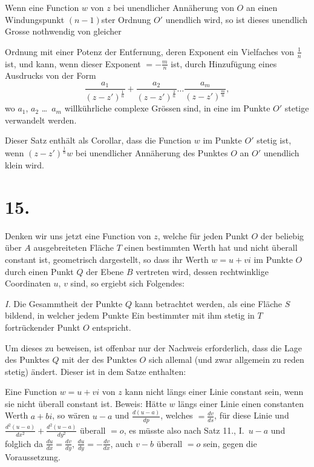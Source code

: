 \documentclass{article}
\begin{document}
Wenn eine Function $w$ von $z$ bei unendlicher Annäherung von $O$ an einen Windungspunkt $(n-1)$ster Ordnung $O'$ unendlich wird, so ist dieses unendlich Grosse nothwendig von gleicher

Ordnung mit einer Potenz der Entfernung, deren Exponent ein Vielfaches von $\frac{1}{n}$ ist, und kann, wenn dieser Exponent $= -\frac{m}{n}$ ist, durch Hinzufügung eines Ausdrucks von der Form
\[
\frac{a_1}{(z - z')^{\frac{1}{n}}} + \frac{a_2}{(z - z')^{\frac{2}{n}}} \dots \frac{a_m}{(z - z')^{\frac{m}{n}}},
\]
wo $a_1$, $a_2$ \dots\ $a_m$ willkührliche complexe Grössen sind, in eine im Punkte $O'$ stetige verwandelt werden.

Dieser Satz enthält als Corollar, dass die Function $w$ im Punkte $O'$ stetig ist, wenn $(z - z')^{\frac{1}{n}} w$ bei unendlicher Annäherung des Punktes $O$ an $O'$ unendlich klein wird.

\section*{15.}

Denken wir uns jetzt eine Function von $z$, welche für jeden Punkt $O$ der beliebig über $A$ ausgebreiteten Fläche $T$ einen bestimmten Werth hat und nicht überall constant ist, geometrisch dargestellt, so dass ihr Werth $w = u + vi$ im Punkte $O$ durch einen Punkt $Q$ der Ebene $B$ vertreten wird, dessen rechtwinklige Coordinaten $u$, $v$ sind, so ergiebt sich Folgendes:

\emph{I.} Die Gesammtheit der Punkte $Q$ kann betrachtet werden, als eine Fläche $S$ bildend, in welcher jedem Punkte Ein bestimmter mit ihm stetig in $T$ fortrückender Punkt $O$ entspricht.

Um dieses zu beweisen, ist offenbar nur der Nachweis erforderlich, dass die Lage des Punktes $Q$ mit der des Punktes $O$ sich allemal (und zwar allgemein zu reden stetig) ändert. Dieser ist in dem Satze enthalten:

Eine Function $w = u + vi$ von $z$ kann nicht längs einer Linie constant sein, wenn sie nicht überall constant ist. Beweis: Hätte $w$ längs einer Linie einen constanten Werth $a + bi$, so wären $u - a$ und $\frac{d(u - a)}{dp}$, welches $= \frac{dv}{ds}$, für diese Linie und $\frac{d^2(u - a)}{dx^2} + \frac{d^2(u - a)}{dy^2}$ überall $= o$, es müsste also nach Satz 11., I.\ $u - a$ und folglich da $\frac{du}{dx} = \frac{dv}{dy}$, $\frac{du}{dy} = -\frac{dv}{dx}$, auch $v - b$ überall $= o$ sein, gegen die Voraussetzung.
\end{document}
